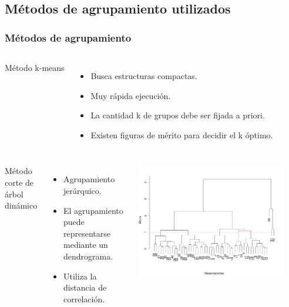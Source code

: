 \documentclass[serif,9pt, t]{beamer}
\begin{document}
\subsection{Métodos de agrupamiento utilizados}
\begin{frame}\frametitle{Métodos de agrupamiento} 
\begin{columns}[T]
Método k-means
\begin{itemize}
	\item Busca estructuras compactas.
	\item Muy rápida ejecución. 
	\item La cantidad k de grupos debe ser fijada a priori.  
	\item Existen figuras de mérito para decidir el k óptimo.
\end{itemize}
\end{columns}
\bigskip
\bigskip
\begin{columns}[T]
Método corte de árbol dinámico
\begin{itemize}
	\item Agrupamiento jerárquico.
	\item El agrupamiento puede representarse mediante un dendrograma.
	\item Utiliza la distancia de correlación.
\end{itemize}			
    \centering
    \includegraphics[width=0.9\textwidth]{dendrograma_muestra.pdf}
\end{columns}
\end{frame}
\end{document}
